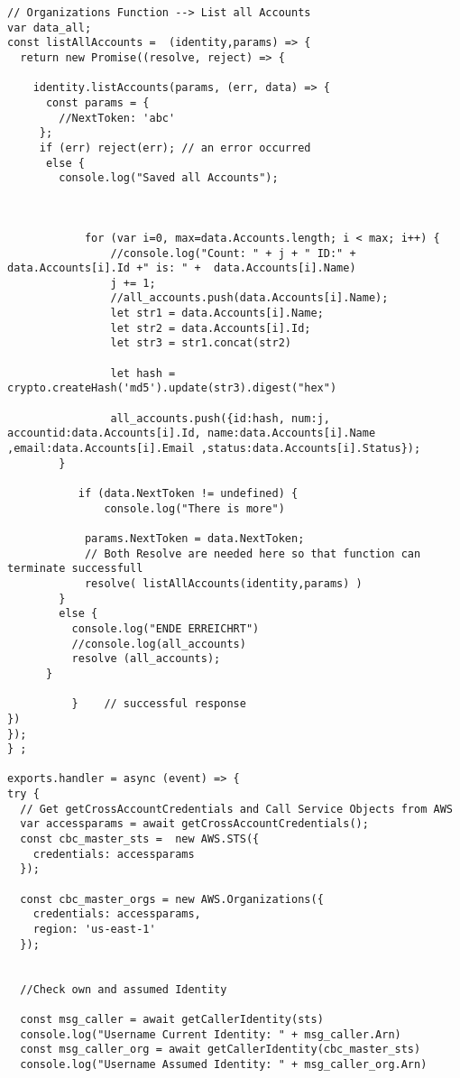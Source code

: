 \begin{lstlisting}[caption={Lambda-Code in NodeJS},
label=lst:LambdaCode,basicstyle=\ttfamily\small ]
// Organizations Function --> List all Accounts
var data_all;
const listAllAccounts =  (identity,params) => {
  return new Promise((resolve, reject) => {

    identity.listAccounts(params, (err, data) => {
      const params = {
        //NextToken: 'abc'
     };
     if (err) reject(err); // an error occurred
      else {
        console.log("Saved all Accounts");



            for (var i=0, max=data.Accounts.length; i < max; i++) {
                //console.log("Count: " + j + " ID:" + data.Accounts[i].Id +" is: " +  data.Accounts[i].Name)
                j += 1;
                //all_accounts.push(data.Accounts[i].Name);
                let str1 = data.Accounts[i].Name;
                let str2 = data.Accounts[i].Id;
                let str3 = str1.concat(str2)

                let hash = crypto.createHash('md5').update(str3).digest("hex")

                all_accounts.push({id:hash, num:j, accountid:data.Accounts[i].Id, name:data.Accounts[i].Name ,email:data.Accounts[i].Email ,status:data.Accounts[i].Status});
        }

           if (data.NextToken != undefined) {
               console.log("There is more")

            params.NextToken = data.NextToken;
            // Both Resolve are needed here so that function can terminate successfull
            resolve( listAllAccounts(identity,params) )
        }
        else {
          console.log("ENDE ERREICHRT")
          //console.log(all_accounts)
          resolve (all_accounts);
      }

          }    // successful response
})
});
} ;

exports.handler = async (event) => {
try {
  // Get getCrossAccountCredentials and Call Service Objects from AWS
  var accessparams = await getCrossAccountCredentials();
  const cbc_master_sts =  new AWS.STS({
    credentials: accessparams
  });

  const cbc_master_orgs = new AWS.Organizations({
    credentials: accessparams,
    region: 'us-east-1'
  });


  //Check own and assumed Identity

  const msg_caller = await getCallerIdentity(sts)
  console.log("Username Current Identity: " + msg_caller.Arn)
  const msg_caller_org = await getCallerIdentity(cbc_master_sts)
  console.log("Username Assumed Identity: " + msg_caller_org.Arn)



\end{lstlisting}
